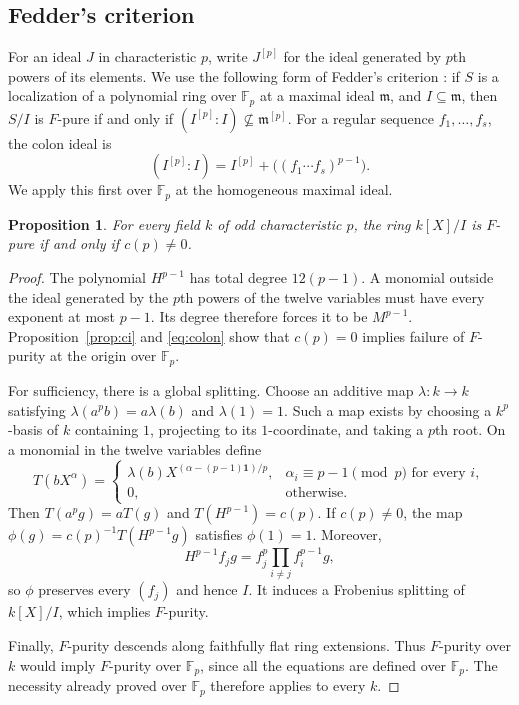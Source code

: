 \documentclass[11pt]{article}
\newtheorem{proposition}[theorem]{Proposition}
\theoremstyle{remark}\newtheorem{remark}[theorem]{Remark}
\newcommand{\F}{\mathbb F}
\newcommand{\m}{\mathfrak m}
\numberwithin{equation}{section}
\begin{document}
\subsection{Fedder's criterion}
For an ideal $J$ in characteristic $p$, write $J^{[p]}$ for the ideal
generated by $p$th powers of its elements. We use the following form
of Fedder's criterion \cite{Fedder}: if $S$ is a localization of a
polynomial ring over $\F_p$ at a maximal ideal $\m$, and $I\subseteq\m$,
then $S/I$ is
$F$-pure if and only if $(I^{[p]}:I)\not\subseteq\m^{[p]}$.
For a regular sequence $f_1,\ldots,f_s$, the colon ideal is
\begin{equation}\label{eq:colon}
 (I^{[p]}:I)=I^{[p]}+\bigl((f_1\cdots f_s)^{p-1}\bigr).
\end{equation}
We apply this first over $\F_p$ at the homogeneous maximal ideal.

\begin{proposition}\label{prop:fedder}
For every field $k$ of odd characteristic $p$, the ring $k[X]/I$ is
$F$-pure if and only if $c(p)\ne0$.
\end{proposition}
\begin{proof}
The polynomial $H^{p-1}$ has total degree $12(p-1)$. A monomial
outside the ideal generated by the $p$th powers of the twelve
variables must have every exponent at most $p-1$. Its degree
therefore forces it to be $M^{p-1}$. Proposition~\ref{prop:ci} and
\eqref{eq:colon} show that $c(p)=0$ implies failure of $F$-purity at
the origin over $\F_p$.

For sufficiency, there is a global splitting. Choose an additive map
$\lambda:k\to k$ satisfying
$\lambda(a^pb)=a\lambda(b)$ and $\lambda(1)=1$.
Such a map exists by choosing a $k^p$-basis of $k$ containing $1$,
projecting to its $1$-coordinate, and taking a $p$th root.
On a monomial in the twelve variables define
\[
 T(bX^{\alpha})=
 \begin{cases}
 \lambda(b)X^{(\alpha-(p-1)\boldsymbol1)/p},
       &\alpha_i\equiv p-1\pmod p\text{ for every }i,\\
 0,&\text{otherwise}.
 \end{cases}
\]
Then $T(a^pg)=aT(g)$ and $T(H^{p-1})=c(p)$. If $c(p)\ne0$,
the map $\phi(g)=c(p)^{-1}T(H^{p-1}g)$ satisfies $\phi(1)=1$.
Moreover,
\[
 H^{p-1}f_jg=f_j^p\prod_{i\ne j}f_i^{p-1}g,
\]
so $\phi$ preserves every $(f_j)$ and hence $I$. It induces a
Frobenius splitting of $k[X]/I$, which implies $F$-purity.

Finally, $F$-purity descends along faithfully flat ring extensions.
Thus $F$-purity over $k$ would imply $F$-purity over $\F_p$, since
all the equations are defined over $\F_p$. The necessity already
proved over $\F_p$ therefore applies to every $k$.
\end{proof}
\end{document}
